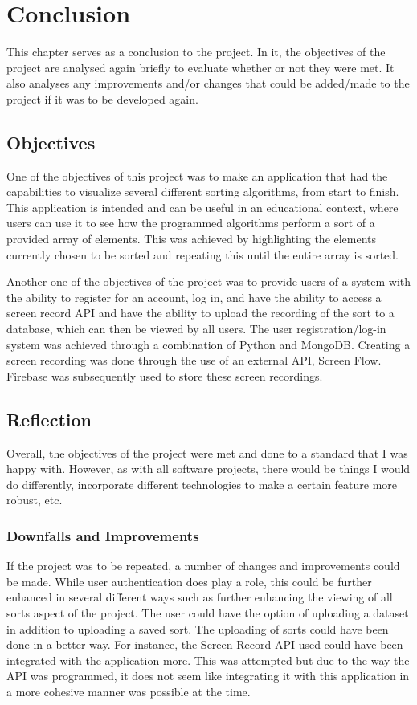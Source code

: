 \chapter{Conclusion}
This chapter serves as a conclusion to the project. In it, the objectives of the project are analysed again briefly to evaluate whether or not they were met. It also analyses any improvements and/or changes that could be added/made to the project if it was to be developed again.

\section{Objectives}
One of the objectives of this project was to make an application that had the capabilities to visualize several different sorting algorithms, from start to finish. This application is intended and can be useful in an educational context, where users can use it to see how the programmed algorithms perform a sort of a provided array of elements. This was achieved by highlighting the elements currently chosen to be sorted and repeating this until the entire array is sorted. 
\par
\bigskip
Another one of the objectives of the project was to provide users of a system with the ability to register for an account, log in, and have the ability to access a screen record API and have the ability to upload the recording of the sort to a database, which can then be viewed by all users. The user registration/log-in system was achieved through a combination of Python and MongoDB. Creating a screen recording was done through the use of an external API, Screen Flow. Firebase was subsequently used to store these screen recordings.

\section{Reflection}
Overall, the objectives of the project were met and done to a standard that I was happy with. However, as with all software projects, there would be things I would do differently, incorporate different technologies to make a certain feature more robust, etc.

\subsection{Downfalls and Improvements}
If the project was to be repeated, a number of changes and improvements could be made. While user authentication does play a role, this could be further enhanced in several different ways such as further enhancing the viewing of all sorts aspect of the project. The user could have the option of uploading a dataset in addition to uploading a saved sort. The uploading of sorts could have been done in a better way. For instance, the Screen Record API used could have been integrated with the application more. This was attempted but due to the way the API was programmed, it does not seem like integrating it with this application in a more cohesive manner was possible at the time. 
\bigskip

